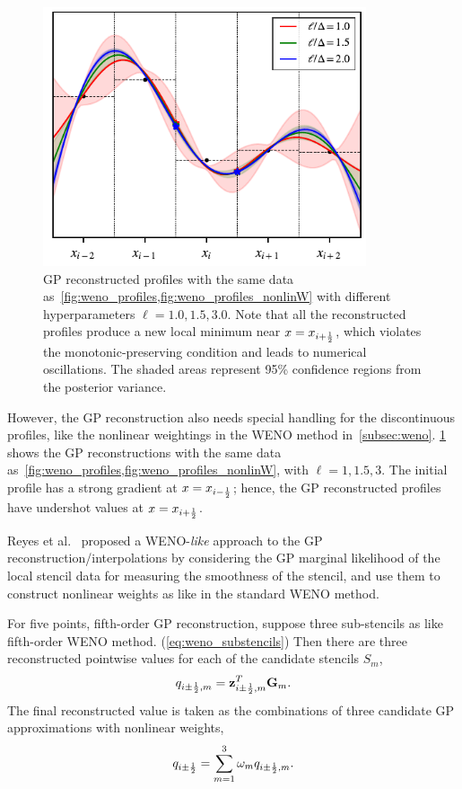 \begin{figure}
    \centering
    \includegraphics[width=0.85\textwidth]{fig/gp_linear_recon}
    \caption{GP reconstructed profiles with the same data as~\cref{fig:weno_profiles,fig:weno_profiles_nonlinW}
        with different hyperparameters \( \ell = 1.0, 1.5, 3.0 \).
        Note that all the reconstructed profiles produce a new local minimum near \( x = x_{{i+\frac{1}{2}}} \),
        which violates the monotonic-preserving condition and leads to numerical oscillations.
        The shaded areas represent 95\% confidence regions from the posterior variance.
    }\label{fig:gp_linear_recon}
\end{figure}

However, the GP reconstruction also needs special handling for the discontinuous profiles,
like the nonlinear weightings in the WENO method in~\cref{subsec:weno}.
\cref{fig:gp_linear_recon} shows the GP reconstructions with the same data as~\cref{fig:weno_profiles,fig:weno_profiles_nonlinW},
with \( \ell = 1, 1.5, 3 \). The initial profile has a strong gradient at \( x = x_{{i-\frac{1}{2}}} \);
hence, the GP reconstructed profiles have undershot values at \( x = x_{{i+\frac{1}{2}}} \).

Reyes et al.~\cite{reyes2019variable} proposed a WENO-\textit{like} approach to
the GP reconstruction/interpolations by considering the GP marginal likelihood of the local stencil data
for measuring the smoothness of the stencil,
and use them to construct nonlinear weights as like in the standard WENO method.

For five points, fifth-order GP reconstruction, suppose three sub-stencils as like fifth-order WENO method. (\cref{eq:weno_substencils})
Then there are three reconstructed pointwise values for each of the candidate stencils \( S_{m} \),
\begin{equation}\label{eq:gp_weno_candidates}
    q_{i \pm \frac{1}{2}, m} = \mathbf{z}_{i \pm \frac{1}{2}, m}^{T} \mathbf{G}_{m}.
\end{equation}
The final reconstructed value is taken as the combinations of three candidate GP approximations with nonlinear weights,
\begin{equation}\label{eq:gp_weno_comb}
    q_{i \pm \frac{1}{2}} = \sum_{m = 1}^{3} \omega_{m} q_{i \pm \frac{1}{2}, m}.
\end{equation}


